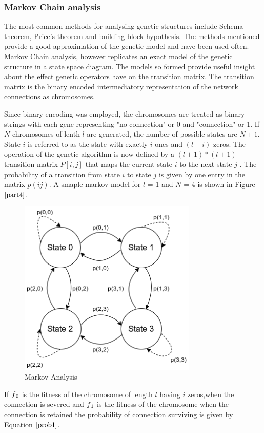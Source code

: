 \documentclass[conference]{IEEEtran}
\begin{document}
\subsubsection{Markov Chain analysis}

The most common methods for analysing genetic structures include Schema theorem, Price's theorem and building block hypothesis. The methods mentioned provide a good approximation of the genetic model and have been used often. Markov Chain analysis, however replicates an exact model of the genetic structure in a state space diagram. The models so formed provide useful insight about the effect genetic operators have on the transition matrix. The transition matrix is the binary encoded intermediatory representation of the network connections as chromosomes. 

Since binary encoding was employed, the chromosomes are treated as binary strings with each gene representing "no connection" or 0 and "connection" or 1. If $N$ chromosomes of lenth $l$ are generated, the number of possible states are $N+1$. State $i$ is referred to as the state with exactly $i$ ones and $(l - i)$ zeros. The operation of the genetic algorithm is now defined by a $(l + 1)*(l + 1)$ transition matrix $P[i, j]$ that maps the current state $i$ to the next state $j$ . The probability of a transition from state $i$ to state $j$ is given by one
entry in the matrix $p(ij)$. A smaple markov model for $l$ = 1 and $N$ = 4 is shown in Figure $\ref{part4}$.

\begin{figure}[!b]
\centerline{\includegraphics[width=85mm]{part4.png}}
\caption{Markov Analysis}
\label{part4}
\end{figure}

If $f\textsubscript{0}$ is the fitness of the chromosome of length $l$ having $i$ zeros,when the connection is severed and $f\textsubscript{1}$ is the fitness of the chromosome when the connection is retained the probability of connection surviving is given by Equation $\ref{prob1}$.
\end{document}
